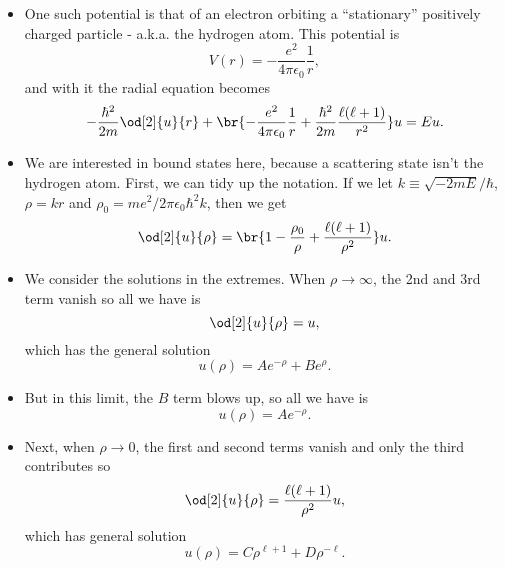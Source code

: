 \begin{itemize}
    \item One such potential is that of an electron orbiting a ``stationary'' positively charged particle - a.k.a. the hydrogen atom. This potential is
        \begin{equation}
            V(r) = -\frac{e^2}{4\pi\epsilon_0} \frac{1}{r},
        \end{equation}
        and with it the radial equation becomes
        \begin{equation}
            -\frac{\hbar^2}{2m}\od[2]{u}{r} + \br{-\frac{e^2}{4\pi\epsilon_0}\frac{1}{r} + \frac{\hbar^2}{2m}\frac{\ell(\ell + 1)}{r^2}}u = Eu.
        \end{equation}
    \item We are interested in bound states here, because a scattering state isn't the hydrogen atom. First, we can tidy up the notation. If we let $k \equiv \sqrt{-2mE}/\hbar$, $\rho=kr$ and $\rho_0 = me^2/2\pi\epsilon_0\hbar^2k$, then we get
        \begin{equation}
            \od[2]{u}{\rho} = \br{1 - \frac{\rho_0}{\rho} + \frac{\ell(\ell + 1)}{\rho^2}}u.
        \end{equation}
    \item We consider the solutions in the extremes. When $\rho \rightarrow \infty$, the 2nd and 3rd term vanish so all we have is
        \begin{equation}
            \od[2]{u}{\rho} = u,
        \end{equation}
        which has the general solution
        \begin{equation}
            u(\rho) = Ae^{-\rho} + Be^{\rho}.
        \end{equation}
    \item But in this limit, the $B$ term blows up, so all we have is
        \begin{equation}
            u(\rho) = Ae^{-\rho}.
        \end{equation}
    \item Next, when $\rho \rightarrow 0$, the first and second terms vanish and only the third contributes so
        \begin{equation}
            \od[2]{u}{\rho} = \frac{\ell(\ell + 1)}{\rho^2}u,
        \end{equation}
        which has general solution
        \begin{equation}
            u(\rho) = C\rho^{\ell+1} + D\rho^{-\ell}.
        \end{equation}

\end{itemize}
